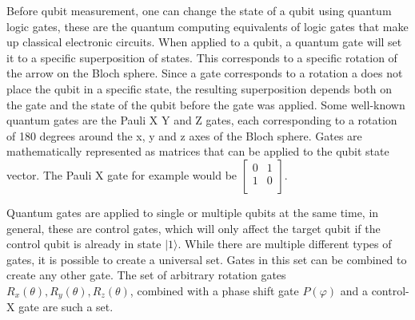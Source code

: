 Before qubit measurement, one can change the state of a qubit using quantum logic gates, these are the quantum computing equivalents of logic 
gates that make up classical electronic circuits. When applied to a qubit, a quantum gate will set it to a specific superposition of states. This corresponds to a 
specific rotation of the arrow on the Bloch sphere. Since a gate corresponds to a rotation a does not place the qubit in a specific state, the resulting superposition
depends both on the gate and the state of the qubit before the gate was applied. Some well-known quantum gates are the Pauli X Y and Z gates, each corresponding to a 
rotation of 180 degrees around the x, y and z axes of the Bloch sphere. Gates are mathematically represented as matrices that can be applied to the qubit state vector.
The Pauli X gate for example would be $\begin{bmatrix}
    0 & 1\\
    1 & 0\\
\end{bmatrix}$.


Quantum gates are applied to single or multiple qubits at the same time, in general, these are control gates, which will only affect the target qubit if the control qubit
is already in state $|1 \rangle$. While there are multiple different types of gates, it is possible to create a universal set. Gates in this set can be
combined to create any other gate. The set of arbitrary rotation gates $R_x(\theta), R_y(\theta), R_z(\theta)$, combined with a phase shift gate $P(\varphi)$ and a control-X 
gate are such a set.
 \newpage

